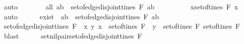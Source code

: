 \begin{isabellebody}
\ auto\isanewline
\ \ \ \ \isamarkupfalse%
\ \isamarkupfalse%
\ all{\isacharcolon}{\isachardoublequoteopen}{\isasymforall}\ {\isacharparenleft}a{\isacharcomma}b{\isacharparenright}\ {\isasymin}\ set{\isacharunderscore}of{\isacharunderscore}edge{\isacharunderscore}disjoint{\isacharunderscore}tines\ F{\isachardot}\ {\isacharparenleft}a{\isacharcomma}b{\isacharparenright}\ {\isacharequal}\ {\isacharparenleft}{\isacharbrackleft}{\isacharbrackright}{\isacharcomma}{\isacharbrackleft}{\isacharbrackright}{\isacharparenright}{\isachardoublequoteclose}\isanewline
\ \ \ \ \ \ \isamarkupfalse%
\ {\isacartoucheopen}{\isasymforall}x{\isasymin}set{\isacharunderscore}of{\isacharunderscore}tines\ F{\isachardot}\ x\ {\isacharequal}\ {\isacharbrackleft}{\isacharbrackright}{\isacartoucheclose}\ \isamarkupfalse%
\ auto\isanewline
\ \ \ \ \isamarkupfalse%
\ exist{\isacharcolon}\ {\isachardoublequoteopen}{\isasymexists}\ {\isacharparenleft}a{\isacharcomma}b{\isacharparenright}\ {\isasymin}\ set{\isacharunderscore}of{\isacharunderscore}edge{\isacharunderscore}disjoint{\isacharunderscore}tines\ F{\isachardot}\ {\isacharparenleft}a{\isacharcomma}b{\isacharparenright}\ {\isacharequal}\ {\isacharparenleft}{\isacharbrackleft}{\isacharbrackright}{\isacharcomma}{\isacharbrackleft}{\isacharbrackright}{\isacharparenright}{\isachardoublequoteclose}\isanewline
\ \ \ \ \ \ \isamarkupfalse%
\ {\isacartoucheopen}set{\isacharunderscore}of{\isacharunderscore}edge{\isacharunderscore}disjoint{\isacharunderscore}tines\ F\ {\isacharequal}\ {\isacharbraceleft}{\isacharparenleft}x{\isacharcomma}\ y{\isacharparenright}{\isachardot}\ x\ {\isasymin}\ set{\isacharunderscore}of{\isacharunderscore}tines\ F\ {\isasymand}\ y\ {\isasymin}\ set{\isacharunderscore}of{\isacharunderscore}tines\ F{\isacharbraceright}{\isacartoucheclose}\ {\isacartoucheopen}set{\isacharunderscore}of{\isacharunderscore}tines\ F\ {\isacharequal}\ {\isacharbraceleft}{\isacharbrackleft}{\isacharbrackright}{\isacharbraceright}{\isacartoucheclose}\ \isamarkupfalse%
\ blast\isanewline
\ \ \ \ \isamarkupfalse%
\ set{\isacharunderscore}nil{\isacharunderscore}pair{\isacharcolon}{\isachardoublequoteopen}set{\isacharunderscore}of{\isacharunderscore}edge{\isacharunderscore}disjoint{\isacharunderscore}tines\ F{\isacharequal}{\isacharbraceleft}{\isacharparenleft}{\isacharbrackleft}{\isacharbrackright}{\isacharcomma}{\isacharbrackleft}{\isacharbrackright}{\isacharparenright}{\isacharbraceright}{\isachardoublequoteclose}\isanewline

\end{isabellebody}
